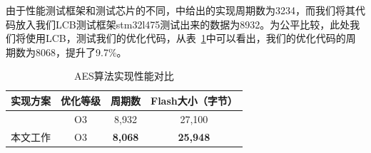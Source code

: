 \documentclass[11pt,a4paper]{article}
\begin{document}
由于性能测试框架和测试芯片的不同，\cite{Schwabe2016}中给出的实现周期数为3234，而我们将其代码放入我们LCB测试框架stm32l475测试出来的数据为8932。为公平比较，此处我们将使用LCB，测试我们的优化代码，从表~\ref{tab:shift_row}中可以看出，我们的优化代码的周期数为8068，提升了9.7\%。

\begin{table}[ht]
    \centering
    \caption{AES算法实现性能对比}
    \label{tab:shift_row}
    \begin{tabular}{lccc}
        \toprule
        实现方案 & 优化等级 & 周期数 & Flash大小（字节） \\
        \midrule
        \multirow{1}{*}{\cite{Schwabe2016}} 
            & O3 & 8,932 & 27,100 \\
        \midrule
        \multirow{1}{*}{本文工作} 
            & O3 & \textbf{8,068} & \textbf{25,948} \\

        \bottomrule
    \end{tabular}
\end{table}

\newpage
\vfill




\end{document}

